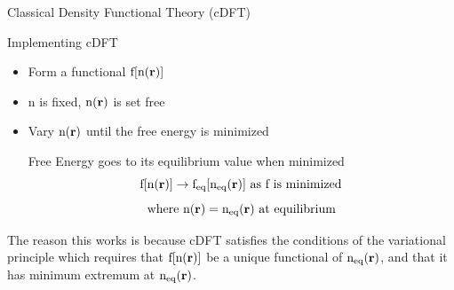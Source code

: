 \documentclass{beamer}
\renewcommand{\vec}[1]{\mathbf{#1}}
\begin{document}
\begin{frame}{Classical Density Functional Theory (cDFT)}
    \begin{block}{Implementing cDFT}
    \begin{itemize}
       \item Form a functional $\text f[\text n(\vec r)]$
       \item n is fixed, $\text n(\vec{r})$ is set free
       \item Vary $\text n(\vec{r})$ until the free energy is minimized 
       
       Free Energy goes to its equilibrium value when minimized      
       \begin{displaymath}\text f[\text n(\vec r)]\rightarrow \text f_{\text{eq}}[\text n_{\text{eq}}(\vec r)]  \mbox{ as f is minimized} \end{displaymath}
       \begin{displaymath}{\mbox{where }  \text n(\vec{r}) = \text n_{\text{eq}}(\vec r)  \mbox{ at equilibrium}}\end{displaymath}              
       
     \end{itemize} 
     \end{block}
The reason this works is because cDFT satisfies the conditions 
of the variational principle which requires that  $\text f[\text n(\vec r)]$ 
be a unique functional of  $\text n_{\text{eq}}(\vec{r})$, and that it has 
minimum extremum at $\text n_{\text{eq}}(\vec{r})$.
\end{frame}


\end{document}

